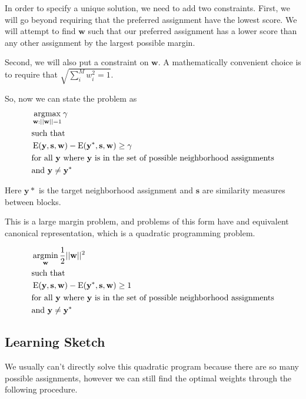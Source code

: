 In order to specify a unique solution, we need to add two
constraints. First, we will go beyond requiring that the preferred
assignment have the lowest score. We will attempt to find $\mathbf{w}$
such that our preferred assignment has a lower score than any other
assignment by the largest possible margin. 

Second, we will also put a constraint on $\mathbf{w}$. A
mathematically convenient choice is to require that $\sqrt{\sum_i^M w_i^2 = 1}$.

So, now we can state the problem as 
%
\begin{align*}
&\operatorname*{\arg\!\max}_{\mathbf{w}:||\mathbf{w}||=1} \mathbf{\gamma} \\
&\text{such that} \\
&\operatorname{E}(\mathbf{y}, \mathbf{s}, \mathbf{w})
- \operatorname{E}(\mathbf{y}^*, \mathbf{s}, \mathbf{w}) \geq \gamma\\ 
&\text{for all } \mathbf{y} \text{ where } \mathbf{y} \text{ is in the set of
  possible neighborhood assignments}\\
&\text{and } \mathbf{y} \neq \mathbf{y}^*
\end{align*}
%

Here $\mathbf{y}*$ is the target neighborhood assignment and $\mathbf{s}$
are similarity measures between blocks. 

This is a large margin problem, and problems of this form have and
equivalent canonical representation, which is a quadratic programming
problem.

%
\begin{align*}
&\operatorname*{\arg\!\min}_{\mathbf{w}} \frac{1}{2}||\mathbf{w}||^2 \\
&\text{such that} \\
&\operatorname{E}(\mathbf{y}, \mathbf{s}, \mathbf{w})
- \operatorname{E}(\mathbf{y}^*, \mathbf{s}, \mathbf{w}) \geq 1 \\ 
&\text{for all } \mathbf{y} \text{ where } \mathbf{y} \text{ is in the set of
  possible neighborhood assignments}\\
&\text{and } \mathbf{y} \neq \mathbf{y}^*
\end{align*}


\subsection*{Learning Sketch}
We usually can't directly solve this quadratic program because there
are so many possible assignments, however we can still find the
optimal weights through the following procedure.

